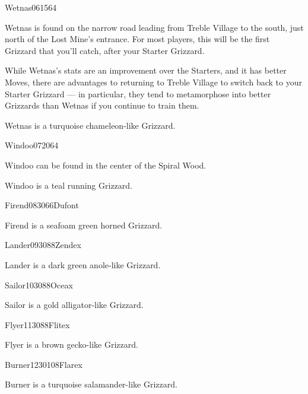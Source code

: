 \documentclass[10pt,twocolumn]{memoir}
\begin{document}
\begin{grizzardpage}{Wetnas}{06}{15}{6}{4}{}

  Wetnas is found on the narrow  road leading from Treble Village to the
  south, just north of the Lost  Mine's entrance. For most players, this
  will   be  the   first  Grizzard   that  you'll   catch,  after   your
  Starter Grizzard.

  While Wetnas's stats are an improvement  over the Starters, and it has
  better Moves, there  are advantages to returning to  Treble Village to
  switch back  to your Starter  Grizzard —  in particular, they  tend to
  metamorphose  into better  Grizzards than  Wetnas if  you continue  to
  train them.

  Wetnas is a turquoise chameleon-like Grizzard.
  
\end{grizzardpage}

\begin{grizzardpage}{Windoo}{07}{20}{6}{4}{}

  Windoo can be found in the center of the Spiral Wood.

  Windoo is a teal running Grizzard.

\end{grizzardpage}

\begin{grizzardpage}{Firend}{08}{30}66{Dufont}

  Firend is a seafoam green horned Grizzard.

\end{grizzardpage}

\begin{grizzardpage}{Lander}{09}{30}88{Zendex}

  Lander is a dark green anole-like Grizzard.

\end{grizzardpage}

\begin{grizzardpage}{Sailor}{10}{30}88{Oceax}

  Sailor is a gold alligator-like Grizzard.

\end{grizzardpage}

\begin{grizzardpage}{Flyer}{11}{30}88{Flitex}

  Flyer is a brown gecko-like Grizzard.

\end{grizzardpage}

\begin{grizzardpage}{Burner}{12}{30}{10}{8}{Flarex}

  Burner is a turquoise salamander-like Grizzard.

\end{grizzardpage}
\end{document}
